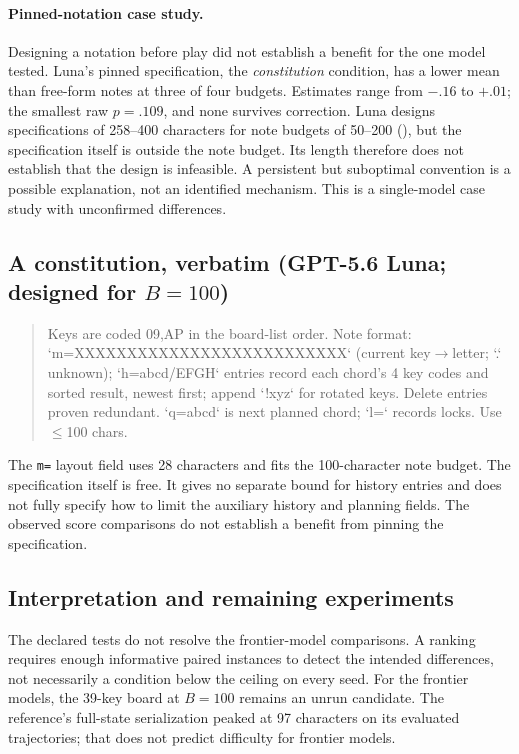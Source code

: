 \paragraph{Pinned-notation case study.}\label{app:lockin}
Designing a notation before play did not establish a benefit for the one model tested. Luna's pinned specification, the \emph{constitution} condition, has a lower mean than free-form notes at three of four budgets. Estimates range from $-.16$ to $+.01$; the smallest raw $p{=}.109$, and none survives correction. Luna designs specifications of 258--400 characters for note budgets of 50--200 (), but the specification itself is outside the note budget. Its length therefore does not establish that the design is infeasible. A persistent but suboptimal convention is a possible explanation, not an identified mechanism. This is a single-model case study with unconfirmed differences.

\subsection{A constitution, verbatim (GPT-5.6 Luna; designed for \texorpdfstring{$B{=}100$}{B=100})}\label{app:constitution}
\begin{quote}\footnotesize\ttfamily\raggedright\sloppy
Keys are coded 0\textendash{}9,A\textendash{}P in the board-list order. Note format: `m=XXXXXXXXXXXXXXXXXXXXXXXXXX` (current key$\to$letter; `.` unknown); `h=abcd/EFGH` entries record each chord's 4 key codes and sorted result, newest first; append `!xyz` for rotated keys. Delete entries proven redundant. `q=abcd` is next planned chord; `l=` records locks. Use $\leq$100 chars.
\end{quote}
The \texttt{m=} layout field uses 28 characters and fits the 100-character note budget. The specification itself is free. It gives no separate bound for history entries and does not fully specify how to limit the auxiliary history and planning fields. The observed score comparisons do not establish a benefit from pinning the specification.

\FloatBarrier

\subsection{Interpretation and remaining experiments}\label{app:interpretation}
The declared tests do not resolve the frontier-model comparisons. A ranking requires enough informative paired instances to detect the intended differences, not necessarily a condition below the ceiling on every seed. For the frontier models, the 39-key board at $B{=}100$ remains an unrun candidate. The reference's full-state serialization peaked at 97 characters on its evaluated trajectories; that does not predict difficulty for frontier models.

